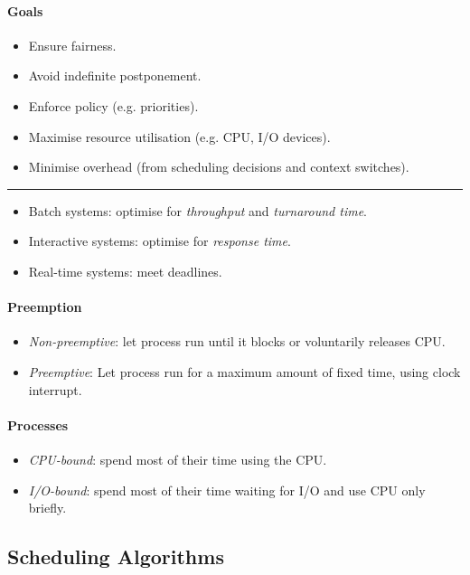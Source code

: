 \documentclass[twocolumn,english]{article}
\begin{document}
\paragraph{Goals}
\begin{itemize}
\item Ensure fairness.
\item Avoid indefinite postponement.
\item Enforce policy (e.g. priorities).
\item Maximise resource utilisation (e.g. CPU, I/O devices).
\item Minimise overhead (from scheduling decisions and context switches).
\end{itemize}
\rule{0.25\columnwidth}{0.5pt}
\begin{itemize}
\item Batch systems: optimise for \emph{throughput} and \emph{turnaround
time}.
\item Interactive systems: optimise for \emph{response time}.
\item Real-time systems: meet deadlines.
\end{itemize}

\paragraph{Preemption}
\begin{itemize}
\item \emph{Non-preemptive}: let process run until it blocks or voluntarily
releases CPU.
\item \emph{Preemptive}: Let process run for a maximum amount of fixed time,
using clock interrupt.
\end{itemize}

\paragraph{Processes}
\begin{itemize}
\item \emph{CPU-bound}: spend most of their time using the CPU.
\item \emph{I/O-bound}: spend most of their time waiting for I/O and use
CPU only briefly.
\end{itemize}

\subsection{Scheduling Algorithms}
\end{document}
